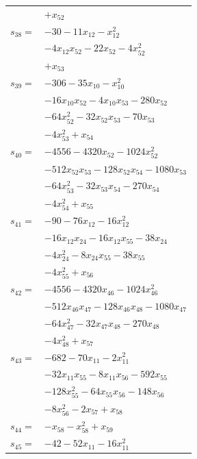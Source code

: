 \begin{longtable}{@{}r@{\;}l@{}}
 & \(\displaystyle +x_{52}\) \\[3pt]
\(s_{38}=\) & \(\displaystyle -30 -11x_{12} -x_{12}^{2}\) \\
 & \(\displaystyle -4x_{12}x_{52} -22x_{52} -4x_{52}^{2}\) \\
 & \(\displaystyle +x_{53}\) \\[3pt]
\(s_{39}=\) & \(\displaystyle -306 -35x_{10} -x_{10}^{2}\) \\
 & \(\displaystyle -16x_{10}x_{52} -4x_{10}x_{53} -280x_{52}\) \\
 & \(\displaystyle -64x_{52}^{2} -32x_{52}x_{53} -70x_{53}\) \\
 & \(\displaystyle -4x_{53}^{2} +x_{54}\) \\[3pt]
\(s_{40}=\) & \(\displaystyle -4556 -4320x_{52} -1024x_{52}^{2}\) \\
 & \(\displaystyle -512x_{52}x_{53} -128x_{52}x_{54} -1080x_{53}\) \\
 & \(\displaystyle -64x_{53}^{2} -32x_{53}x_{54} -270x_{54}\) \\
 & \(\displaystyle -4x_{54}^{2} +x_{55}\) \\[3pt]
\(s_{41}=\) & \(\displaystyle -90 -76x_{12} -16x_{12}^{2}\) \\
 & \(\displaystyle -16x_{12}x_{24} -16x_{12}x_{55} -38x_{24}\) \\
 & \(\displaystyle -4x_{24}^{2} -8x_{24}x_{55} -38x_{55}\) \\
 & \(\displaystyle -4x_{55}^{2} +x_{56}\) \\[3pt]
\(s_{42}=\) & \(\displaystyle -4556 -4320x_{46} -1024x_{46}^{2}\) \\
 & \(\displaystyle -512x_{46}x_{47} -128x_{46}x_{48} -1080x_{47}\) \\
 & \(\displaystyle -64x_{47}^{2} -32x_{47}x_{48} -270x_{48}\) \\
 & \(\displaystyle -4x_{48}^{2} +x_{57}\) \\[3pt]
\(s_{43}=\) & \(\displaystyle -682 -70x_{11} -2x_{11}^{2}\) \\
 & \(\displaystyle -32x_{11}x_{55} -8x_{11}x_{56} -592x_{55}\) \\
 & \(\displaystyle -128x_{55}^{2} -64x_{55}x_{56} -148x_{56}\) \\
 & \(\displaystyle -8x_{56}^{2} -2x_{57} +x_{58}\) \\[3pt]
\(s_{44}=\) & \(\displaystyle -x_{58} -x_{58}^{2} +x_{59}\) \\[3pt]
\(s_{45}=\) & \(\displaystyle -42 -52x_{11} -16x_{11}^{2}\) \\

\end{longtable}
